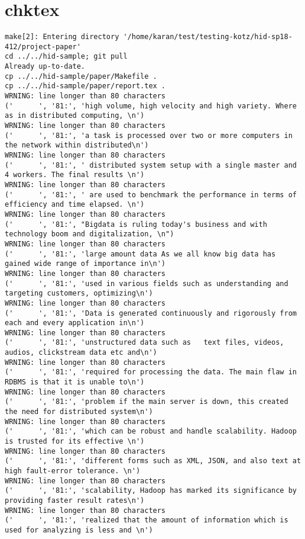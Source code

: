 \appendix
\section{chktex}
\begin{tiny}
\begin{verbatim}
make[2]: Entering directory '/home/karan/test/testing-kotz/hid-sp18-412/project-paper'
cd ../../hid-sample; git pull
Already up-to-date.
cp ../../hid-sample/paper/Makefile .
cp ../../hid-sample/paper/report.tex .
WRNING: line longer than 80 characters
('      ', '81:', 'high volume, high velocity and high variety. Where as in distributed computing, \n')
WRNING: line longer than 80 characters
('      ', '81:', 'a task is processed over two or more computers in the network within distributed\n')
WRNING: line longer than 80 characters
('      ', '81:', ' distributed system setup with a single master and 4 workers. The final results \n')
WRNING: line longer than 80 characters
('      ', '81:', ' are used to benchmark the performance in terms of efficiency and time elapsed. \n')
WRNING: line longer than 80 characters
('      ', '81:', "Bigdata is ruling today's business and with technology boom and digitalization, \n")
WRNING: line longer than 80 characters
('      ', '81:', 'large amount data As we all know big data has gained wide range of importance in\n')
WRNING: line longer than 80 characters
('      ', '81:', 'used in various fields such as understanding and targeting customers, optimizing\n')
WRNING: line longer than 80 characters
('      ', '81:', 'Data is generated continuously and rigorously from each and every application in\n')
WRNING: line longer than 80 characters
('      ', '81:', 'unstructured data such as   text files, videos, audios, clickstream data etc and\n')
WRNING: line longer than 80 characters
('      ', '81:', 'required for processing the data. The main flaw in RDBMS is that it is unable to\n')
WRNING: line longer than 80 characters
('      ', '81:', 'problem if the main server is down, this created the need for distributed system\n')
WRNING: line longer than 80 characters
('      ', '81:', 'which can be robust and handle scalability. Hadoop is trusted for its effective \n')
WRNING: line longer than 80 characters
('      ', '81:', 'different forms such as XML, JSON, and also text at high fault-error tolerance. \n')
WRNING: line longer than 80 characters
('      ', '81:', 'scalability, Hadoop has marked its significance by providing faster result rates\n')
WRNING: line longer than 80 characters
('      ', '81:', 'realized that the amount of information which is used for analyzing is less and \n')

\end{verbatim}
\end{tiny}
